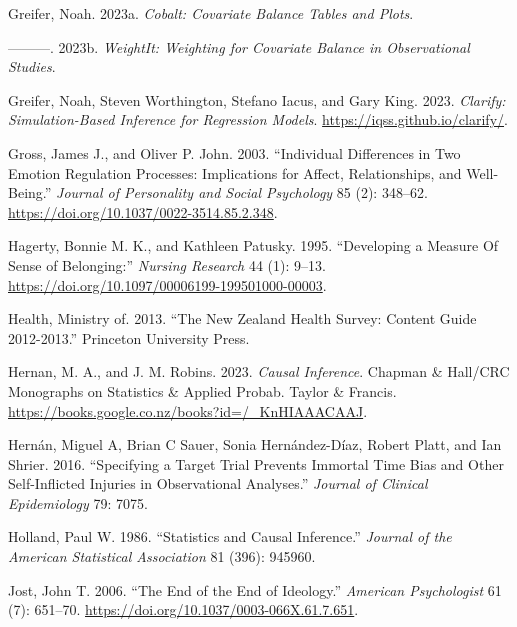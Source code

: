 \documentclass[
  singlecolumn]{report}
\newlength{\cslhangindent}
\newlength{\cslentryspacingunit} %
\newenvironment{CSLReferences}[2] %
 {%
  \setlength{\parindent}{0pt}
  \ifodd #1
  \let\oldpar\par
  \def\par{\hangindent=\cslhangindent\oldpar}
  \fi
  \setlength{\parskip}{#2\cslentryspacingunit}
 }%
 {}
\begin{document}
\begin{CSLReferences}{1}{0}
\leavevmode{}%
Greifer, Noah. 2023a. \emph{Cobalt: Covariate Balance Tables and Plots}.

\leavevmode{}%
---------. 2023b. \emph{WeightIt: Weighting for Covariate Balance in
Observational Studies}.

\leavevmode{}%
Greifer, Noah, Steven Worthington, Stefano Iacus, and Gary King. 2023.
\emph{Clarify: Simulation-Based Inference for Regression Models}.
\url{https://iqss.github.io/clarify/}.

\leavevmode{}%
Gross, James J., and Oliver P. John. 2003. {``Individual Differences in
Two Emotion Regulation Processes: Implications for Affect,
Relationships, and Well-Being.''} \emph{Journal of Personality and
Social Psychology} 85 (2): 348--62.
\url{https://doi.org/10.1037/0022-3514.85.2.348}.

\leavevmode{}%
Hagerty, Bonnie M. K., and Kathleen Patusky. 1995. {``Developing a
Measure Of Sense of Belonging:''} \emph{Nursing Research} 44 (1): 9--13.
\url{https://doi.org/10.1097/00006199-199501000-00003}.

\leavevmode{}%
Health, Ministry of. 2013. {``The New Zealand Health Survey: Content
Guide 2012-2013.''} Princeton University Press.

\leavevmode{}%
Hernan, M. A., and J. M. Robins. 2023. \emph{Causal Inference}. Chapman
\& Hall/CRC Monographs on Statistics \& Applied Probab. Taylor \&
Francis. \url{https://books.google.co.nz/books?id=/_KnHIAAACAAJ}.

\leavevmode{}%
Hernán, Miguel A, Brian C Sauer, Sonia Hernández-Díaz, Robert Platt, and
Ian Shrier. 2016. {``Specifying a Target Trial Prevents Immortal Time
Bias and Other Self-Inflicted Injuries in Observational Analyses.''}
\emph{Journal of Clinical Epidemiology} 79: 7075.

\leavevmode{}%
Holland, Paul W. 1986. {``Statistics and Causal Inference.''}
\emph{Journal of the American Statistical Association} 81 (396): 945960.

\leavevmode{}%
Jost, John T. 2006. {``The End of the End of Ideology.''} \emph{American
Psychologist} 61 (7): 651--70.
\url{https://doi.org/10.1037/0003-066X.61.7.651}.


\end{CSLReferences}
\end{document}
